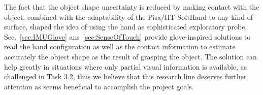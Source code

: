 \documentclass[a4paper,11pt,pdf]{pacmanreport}
\begin{document}

The fact that the object shape uncertainty is reduced by making contact with the object, combined with the adaptability of the Pisa/IIT SoftHand to any kind of surface, shaped the idea of using the hand as sophisticated exploratory probe. Sec.~\ref{sec:IMUGlove} ans~\ref{sec:SenseOfTouch} provide glove-inspired solutions to read the hand configuration as well as the contact information to estimate accurately the object shape as the result of grasping the object. The solution can help greatly in situations where only partial visual information is available, as challenged in Task 3.2, thus we believe that this research line deserves further attention as seems beneficial to accomplish the project goals.








% 
\end{document}

